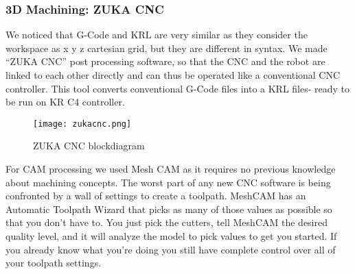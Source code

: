 \subsubsection{3D Machining: ZUKA CNC }
We noticed that G-Code and KRL are very similar as they consider the workspace as x y z cartesian grid, but they are different in syntax. We made “ZUKA CNC” post processing software, so that the CNC and the robot are linked to each other directly and can thus be operated like a conventional CNC controller. This tool converts conventional G-Code files into a KRL files- ready to be run on KR C4 controller.
\begin{figure}[ht]
	\centering
	\caption{ZUKA CNC blockdiagram}
	\texttt{[image: zukacnc.png]}
\end{figure}
For CAM processing we used Mesh CAM as it requires no previous knowledge about machining concepts. The worst part of any new CNC software is being confronted by a wall of settings to create a toolpath. MeshCAM has an Automatic Toolpath Wizard that picks as many of those values as possible so that you don't have to. You just pick the cutters, tell MeshCAM the desired quality level, and it will analyze the model to pick values to get you started. If you already know what you're doing you still have complete control over all of your toolpath settings.
